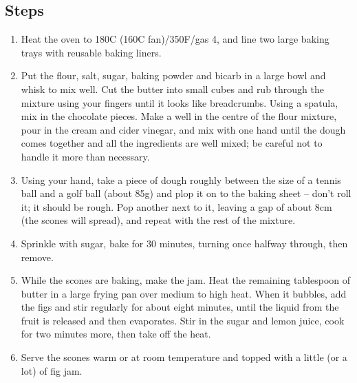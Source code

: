 \documentclass{book}
\begin{document}
\subsection*{Steps}
\begin{enumerate}
\item Heat the oven to 180C (160C fan)/350F/gas 4, and line two large baking trays with reusable baking liners.
\item Put the flour, salt, sugar, baking powder and bicarb in a large bowl and whisk to mix well. Cut the butter into small cubes and rub through the mixture using your fingers until it looks like breadcrumbs. Using a spatula, mix in the chocolate pieces. Make a well in the centre of the flour mixture, pour in the cream and cider vinegar, and mix with one hand until the dough comes together and all the ingredients are well mixed; be careful not to handle it more than necessary.
\item Using your hand, take a piece of dough roughly between the size of a tennis ball and a golf ball (about 85g) and plop it on to the baking sheet – don’t roll it; it should be rough. Pop another next to it, leaving a gap of about 8cm (the scones will spread), and repeat with the rest of the mixture.
\item Sprinkle with sugar, bake for 30 minutes, turning once halfway through, then remove.
\item While the scones are baking, make the jam. Heat the remaining tablespoon of butter in a large frying pan over medium to high heat. When it bubbles, add the figs and stir regularly for about eight minutes, until the liquid from the fruit is released and then evaporates. Stir in the sugar and lemon juice, cook for two minutes more, then take off the heat.
\item Serve the scones warm or at room temperature and topped with a little (or a lot) of fig jam.
\end{enumerate}
\newpage
\end{document}
